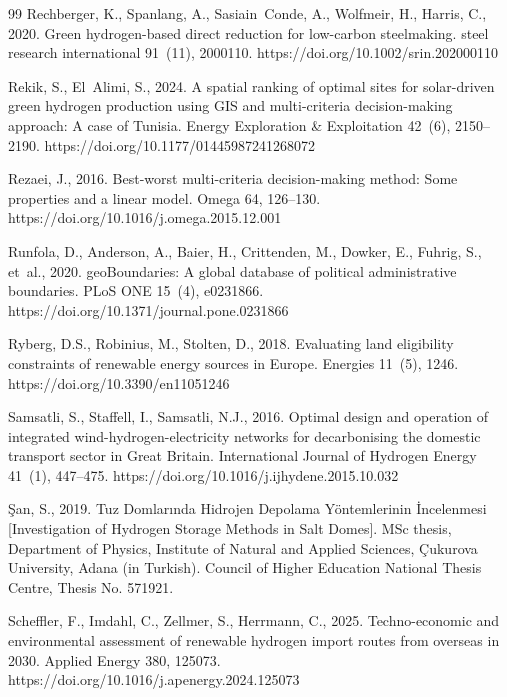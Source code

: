 \documentclass[preprint,12pt,authoryear]{elsarticle}
\begin{document}
\begin{thebibliography}{99}
Rechberger, K., Spanlang, A., Sasiain~Conde, A., Wolfmeir, H., Harris, C., 2020. Green hydrogen-based direct reduction for low-carbon steelmaking. steel research international 91~(11), 2000110. https://doi.org/10.1002/srin.202000110

Rekik, S., El~Alimi, S., 2024. A spatial ranking of optimal sites for solar-driven green hydrogen production using GIS and multi-criteria decision-making approach: A case of Tunisia. Energy Exploration \& Exploitation 42~(6), 2150--2190. https://doi.org/10.1177/01445987241268072

Rezaei, J., 2016. Best-worst multi-criteria decision-making method: Some properties and a linear model. Omega 64, 126--130. https://doi.org/10.1016/j.omega.2015.12.001

Runfola, D., Anderson, A., Baier, H., Crittenden, M., Dowker, E., Fuhrig, S., et~al., 2020. geoBoundaries: A global database of political administrative boundaries. PLoS ONE 15~(4), e0231866. https://doi.org/10.1371/journal.pone.0231866

Ryberg, D.S., Robinius, M., Stolten, D., 2018. Evaluating land eligibility constraints of renewable energy sources in Europe. Energies 11~(5), 1246. https://doi.org/10.3390/en11051246

Samsatli, S., Staffell, I., Samsatli, N.J., 2016. Optimal design and operation of integrated wind-hydrogen-electricity networks for decarbonising the domestic transport sector in Great Britain. International Journal of Hydrogen Energy 41~(1), 447--475. https://doi.org/10.1016/j.ijhydene.2015.10.032

{\c{S}}an, S., 2019. Tuz Domlar{\i}nda Hidrojen Depolama Y{\"o}ntemlerinin {\.I}ncelenmesi [Investigation of Hydrogen Storage Methods in Salt Domes]. MSc thesis, Department of Physics, Institute of Natural and Applied Sciences, {\c{C}}ukurova University, Adana (in Turkish). Council of Higher Education National Thesis Centre, Thesis No. 571921.

Scheffler, F., Imdahl, C., Zellmer, S., Herrmann, C., 2025. Techno-economic and environmental assessment of renewable hydrogen import routes from overseas in 2030. Applied Energy 380, 125073. https://doi.org/10.1016/j.apenergy.2024.125073


\end{thebibliography}
\end{document}
